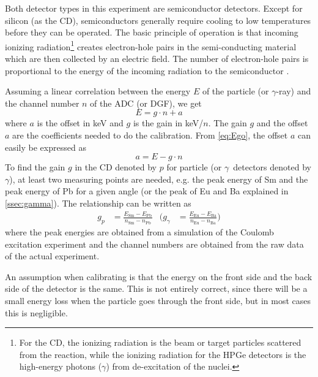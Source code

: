 \documentclass[twoside,english]{uiofysmaster/uiofysmaster}
\newcommand{\ga}{$\gamma$}
\let\orgautoref\autoref
\renewcommand{\autoref}
        {%
		 \def\sectionautorefname{Section}%
		 \def\subsectionautorefname{Section}%
		 \def\subsubsectionautorefname{Section}%
		 \def\chapterautorefname{Chapter}%
          \orgautoref}
\begin{document}
Both detector types in this experiment are semiconductor detectors. 
Except for silicon (as the CD), semiconductors generally require cooling to low temperatures before they can be operated. 
The basic principle of operation is that incoming ionizing radiation\footnote{For the CD, the ionizing radiation is the beam or target particles scattered from the reaction, while the ionizing radiation for the HPGe detectors is the high-energy photons (\ga) from de-excitation of the nuclei.} creates electron-hole pairs in the semi-conducting material which are then collected by an electric field. 
The number of electron-hole pairs is proportional to the energy of the incoming radiation to the semiconductor \cite{WRLeo}. 

Assuming a linear correlation between the energy $E$ of the particle (or \ga-ray) and the channel number $n$ of the ADC (or DGF), we get
\begin{equation}\label{eq:Ego}
	E = g \cdot n + a
\end{equation}
where $a$ is the offset in keV and $g$ is the gain in keV/$n$. 
The gain $g$ and the offset $a$ are the coefficients needed to do the calibration.
From \autoref{eq:Ego}, the offset $a$ can easily be expressed as 
\begin{equation}\label{eq:offset}
	a = E - g \cdot n 
\end{equation}
To find the gain $g$ in the CD denoted by $p$ for particle (or \ga\ detectors denoted by \ga), at least two measuring points are needed, e.g. the peak energy of Sm and the peak energy of Pb for a given angle (or the peak of Eu and Ba explained in \autoref{ssec:gamma}). 
The relationship can be written as 
\begin{align}\label{eq:gain}
	g_p &= \frac{E_{\text{Sm}} - E_{\text{Pb}}}{n_{\text{Sm}} - n_{\text{Pb}}}
	&
	\Bigg( g_\gamma &= \frac{E_{\text{Eu}} - E_{\text{Ba}}}{n_{\text{Eu}} - n_{\text{Ba}}} \Bigg)
\end{align}
where the peak energies are obtained from a simulation of the Coulomb excitation experiment and the channel numbers are obtained from the raw data of the actual experiment.

An assumption when calibrating is that the energy on the front side and the back side of the detector is the same. 
This is not entirely correct, since there will be a small energy loss when the particle goes through the front side, but in most cases this is negligible.


\end{document}

